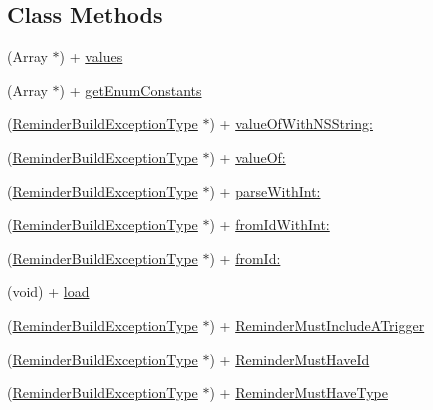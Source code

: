 \subsection*{Class Methods}
\begin{DoxyCompactItemize}
\item 
(Array $\ast$) + \hyperlink{interface_reminder_build_exception_type_a7b0d766fdbc5f6165bab634ca809ad28}{values}
\item 
(Array $\ast$) + \hyperlink{interface_reminder_build_exception_type_ad3fc4f8d985f037417f709a7a951679e}{get\+Enum\+Constants}
\item 
(\hyperlink{interface_reminder_build_exception_type}{Reminder\+Build\+Exception\+Type} $\ast$) + \hyperlink{interface_reminder_build_exception_type_a2a2347c1eba6b1010717b2a8c6c46574}{value\+Of\+With\+N\+S\+String\+:}
\item 
(\hyperlink{interface_reminder_build_exception_type}{Reminder\+Build\+Exception\+Type} $\ast$) + \hyperlink{interface_reminder_build_exception_type_ae9ea2c31b49706697fac169be34f25d0}{value\+Of\+:}
\item 
(\hyperlink{interface_reminder_build_exception_type}{Reminder\+Build\+Exception\+Type} $\ast$) + \hyperlink{interface_reminder_build_exception_type_ad19eb37c4294e438248815f62c9968f3}{parse\+With\+Int\+:}
\item 
(\hyperlink{interface_reminder_build_exception_type}{Reminder\+Build\+Exception\+Type} $\ast$) + \hyperlink{interface_reminder_build_exception_type_a3c3ff704c06cb11a1443935acb174cd9}{from\+Id\+With\+Int\+:}
\item 
(\hyperlink{interface_reminder_build_exception_type}{Reminder\+Build\+Exception\+Type} $\ast$) + \hyperlink{interface_reminder_build_exception_type_a9ec0e39af5f9feeffb209f5097198676}{from\+Id\+:}
\item 
(void) + \hyperlink{interface_reminder_build_exception_type_a5bb936e1643384c1053349f442667765}{load}
\item 
(\hyperlink{interface_reminder_build_exception_type}{Reminder\+Build\+Exception\+Type} $\ast$) + \hyperlink{interface_reminder_build_exception_type_afa03f9a34d3093211f106e3fc3b6b48e}{Reminder\+Must\+Include\+A\+Trigger}
\item 
(\hyperlink{interface_reminder_build_exception_type}{Reminder\+Build\+Exception\+Type} $\ast$) + \hyperlink{interface_reminder_build_exception_type_a75664b5e7e9bb00aba2bf4741d1723f0}{Reminder\+Must\+Have\+Id}
\item 
(\hyperlink{interface_reminder_build_exception_type}{Reminder\+Build\+Exception\+Type} $\ast$) + \hyperlink{interface_reminder_build_exception_type_ab6acb4dc6f2fdb52dcebf140259a81c5}{Reminder\+Must\+Have\+Type}

\end{DoxyCompactItemize}

